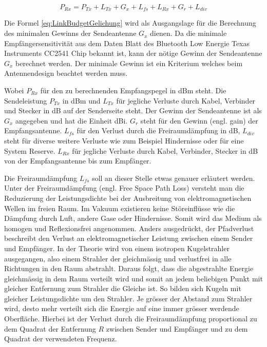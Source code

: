 \begin{equation}
P_{Rx} = P_{Tx}+L_{Tx}+G_{x}+L_{fs}+L_{Rx}+G_{r}+L_{div}\label{eq:LinkBudgetGelichung}
\end{equation}

Die Formel \ref{eq:LinkBudgetGelichung} wird als Ausgangslage für die Berechnung des minimalen Gewinns der Sendeantenne $G_{x}$ dienen. Da  die minimale Empfängersensitivität aus dem Daten Blatt des  Bluetooth Low Energie Texas Instruments CC2541 Chip bekannt ist, kann der nötige Gewinn der Sendeantenne $G_{x}$ berechnet werden. Der minimale Gewinn ist ein Kriterium welches beim Antennendesign beachtet werden muss.

Wobei $P_{Rx}$ für den zu berechnenden Empfangspegel in dBm steht.  Die Sendeleistung $P_{Tx}$ in dBm und $L_{Tx}$ für jegliche Verluste durch Kabel, Verbinder und Stecker in dB auf der Senderseite steht. Der Gewinn der Sendeantenne ist als $G_{x}$ angegeben und hat die Einheit dBi. $G_{r}$ steht für den Gewinn (engl. gain) der Empfangsantenne. $L_{fs}$ für den Verlust durch die Freiraumdämpfung in dB, $L_{div}$ steht für diverse weitere Verluste wie zum Beispiel Hindernisse oder für eine System Reserve.  $L_{Rx}$ für jegliche Verluste durch Kabel, Verbinder, Stecker in dB von der Empfangsantenne bis zum Empfänger.


Die Freiraumdämpfung $L_{fs}$ soll an dieser Stelle etwas genauer erläutert werden. Unter der Freiraumdämpfung (engl. Free Space Path Loss)  versteht man die Reduzierung der Leistungsdichte bei der Ausbreitung von elektromagnetischen Wellen im freien Raum. Im Vakuum existieren keine Störeinflüsse wie die Dämpfung durch Luft, andere Gase oder  Hindernisse. Somit wird das Medium als homogen  und Reflexionsfrei angenommen. Anders ausgedrückt, der Pfadverlust beschreibt den Verlust an elektromagnetischer Leistung zwischen einem Sender und Empfänger.
In der Theorie wird von einem isotropen Kugelstrahler ausgegangen, also einem Strahler der gleichmässig und verlustfrei in alle Richtungen in den Raum abstrahlt. Daraus folgt, dass die abgestrahlte Energie gleichmässig in dem Raum verteilt wird und somit an jedem beliebigen Punkt mit gleicher Entfernung zum Strahler die Gleiche ist. So bilden sich Kugeln mit gleicher Leistungsdichte um den Strahler. Je grösser der Abstand zum Strahler wird, desto mehr verteilt sich die Energie auf eine immer grösser werdende Oberfläche. Hierbei ist der Verlust durch die Freiraumdämpfung proportional zu dem Quadrat der Entfernung $R$ zwischen Sender und Empfänger und zu dem Quadrat der verwendeten Frequenz.
\cite{linkbudget}


